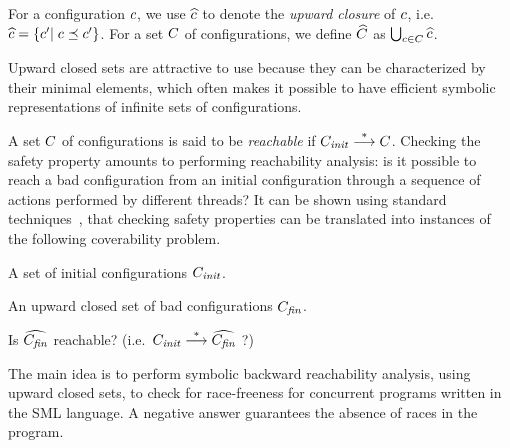For a configuration $c$, we use $\widehat{c}$ to denote the
\emph{upward closure} of $c$, i.e.\
$\widehat{c}=\left\{c'|\;c\preceq c'\right\}$.
%
For a set $C$ of configurations, we define $\widehat{C}$ as
$\bigcup_{c\in C}\widehat{c}$.

Upward closed sets are attractive to use because they can be
characterized by their minimal elements, which often makes it possible
to have efficient symbolic representations of infinite sets of
configurations.



A set $C$ of configurations is said to be \emph{reachable} if
$C_{\it init}\stackrel{*}{\longrightarrow}C$.
%
Checking the safety property amounts to performing reachability
analysis: is it possible to reach a bad configuration from an initial
configuration through a sequence of actions performed by different
threads?
%
It can be shown using standard
techniques~\cite{VW:modelchecking,GoWo:safety}, that checking safety
properties can be translated into instances of the following coverability
problem.

{%
  \item A set of initial configurations $C_{\it init}$.
  \item An upward closed set of bad configurations $C_{\it fin}$.
}{%
Is $\widehat{C_{\it fin}}$ reachable? (i.e.\ $C_{\it init}\stackrel{*}{\longrightarrow}\widehat{C_{\it fin}}$ ?)
}

The main idea is to perform symbolic backward reachability analysis,
using upward closed sets, to check for race-freeness for concurrent
programs written in the SML language. A negative answer guarantees the
absence of races in the program.
